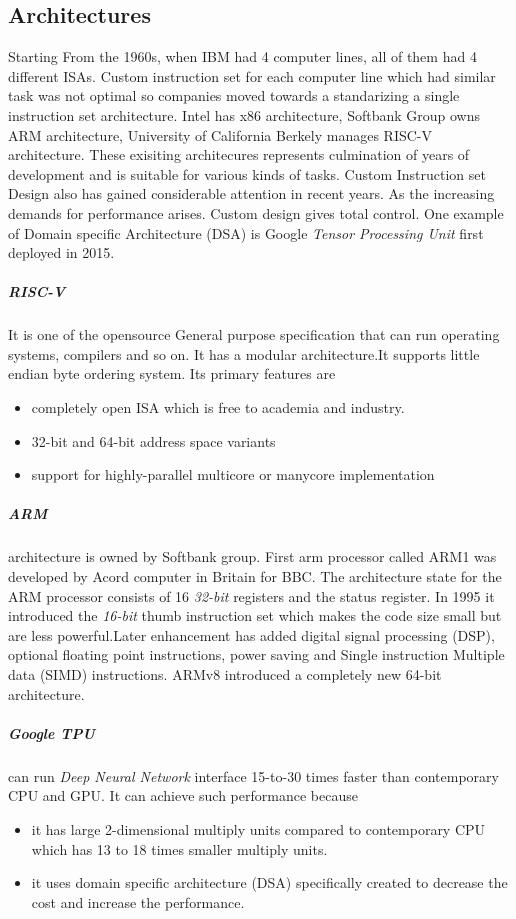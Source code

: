 \documentclass[a4paper,12pt]{article}
\begin{document}
    \subsection{Architectures}
    Starting From the 1960s, when IBM had 4 computer lines, all of them had 4 different ISAs. Custom instruction set for each computer line which had similar task was not optimal so companies moved towards a standarizing a single instruction set architecture. Intel has x86 architecture, Softbank Group owns ARM architecture, University of California Berkely manages RISC-V architecture. These exisiting architecures represents culmination of years of development and is suitable for various kinds of tasks.
    Custom Instruction set Design also has gained considerable attention in recent years. As the increasing demands for performance arises. Custom design gives total control. One example of Domain specific Architecture (DSA) is Google \textit{ Tensor Processing Unit} first deployed in 2015. 
    \subparagraph{RISC-V}
    It is one of the opensource General purpose specification that can run operating systems, compilers and so on. It has a modular architecture.It supports little endian byte ordering system. Its primary features are
    \begin{itemize}
        \item  completely open ISA which is free to academia and industry.
        \item 32-bit and 64-bit address space variants
        \item support for highly-parallel multicore or manycore implementation
    \end{itemize}
    \subparagraph{ARM}
     architecture is owned by Softbank group. First arm processor called ARM1 was developed by Acord computer in Britain for BBC. The architecture state for the ARM processor consists of 16 \textit{32-bit} registers and the status register. In 1995 it introduced the \textit{16-bit} thumb instruction set which makes the code size small but are less powerful.Later enhancement has added digital signal processing (DSP), optional floating point instructions, power saving and Single instruction Multiple data (SIMD) instructions. ARMv8 introduced a completely new 64-bit architecture. 

    \subparagraph{Google TPU}
    can run \textit{Deep Neural Network} interface 15-to-30 times faster  than contemporary CPU and GPU. %
    It can achieve such performance because
    \begin{itemize}
        \item it has large 2-dimensional multiply units compared to contemporary CPU which has 13 to 18 times smaller multiply units.
        \item it uses domain specific architecture (DSA) specifically created to decrease the cost and increase the performance. 
    \end{itemize}
\end{document}
